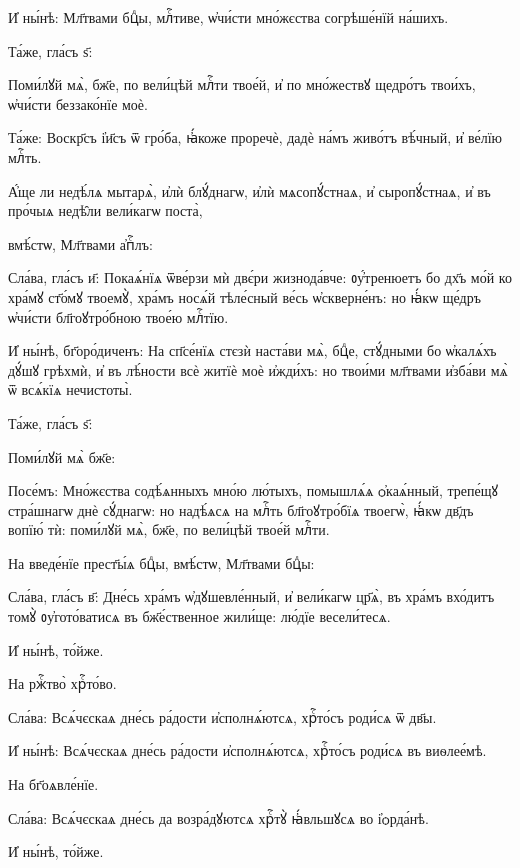 \hKv И҆ ны́нѣ: Мл҃твами бцⷣы, млⷭ҇тиве, ѡ҆чи́сти мно́жєства  согрѣше́нїй на́шихъ. 

\hKv Та́же, гла́съ ѕ҃: 

\hKv Поми́лꙋй мѧ̀, бж҃е, по вели́цѣй млⷭ҇ти твое́й, и҆ по  мно́жествꙋ щедро́тъ твои́хъ, ѡ҆чи́сти беззако́нїе моѐ.  

\hKv Та́же: Воскр҃съ і҆и҃съ ѿ гро́ба, ꙗ҆́коже проречѐ, дадѐ  на́мъ живо́тъ вѣ́чный, и҆ ве́лїю млⷭ҇ть. 

\hKv А҆́ще ли недѣ́лѧ мытарѧ̀, и҆лѝ блꙋ́днагѡ, и҆лѝ  мѧсопꙋ́стнаѧ, и҆ сыропꙋ́стнаѧ, и҆ въ про́чыѧ недѣ̑ли  вели́кагѡ поста̀, 

\hKv вмѣ́стѡ, Мл҃твами а҆пⷭ҇лъ: 

\hKv Сла́ва, гла́съ и҃: Покаѧ́нїѧ ѿве́рзи мѝ двє́ри  жизнода́вче: ᲂу҆́тренюетъ бо дх҃ъ мо́й ко хра́мꙋ ст҃о́мꙋ  твоемꙋ̀, хра́мъ носѧ́й тѣле́сный ве́сь ѡ҆скверне́нъ: но  ꙗ҆́кѡ ще́дръ ѡ҆чи́сти бл҃гоꙋтро́бною твое́ю млⷭ҇тїю. 

\hKv И҆ ны́нѣ, бг҃оро́диченъ: На сп҃се́нїѧ стєзѝ наста́ви мѧ̀,  бцⷣе, стꙋ́дными бо ѡ҆калѧ́хъ дꙋ́шꙋ грѣхмѝ, и҆ въ  лѣ́ности всѐ житїѐ моѐ и҆жди́хъ: но твои́ми мл҃твами  и҆зба́ви мѧ̀ ѿ всѧ́кїѧ нечистоты̀. 

\hKv Та́же, гла́съ ѕ҃:  

\hKv Поми́лꙋй мѧ̀ бж҃е: 
%

\hKv Посе́мъ: Мно́жєства содѣ́ѧнныхъ мно́ю лю́тыхъ, помышлѧ́ѧ  ѻ҆каѧ́нный, трепе́щꙋ стра́шнагѡ днѐ сꙋ́днагѡ: но надѣ́ѧсѧ  на млⷭ҇ть бл҃гоꙋтро́бїѧ твоегѡ̀, ꙗ҆́кѡ дв҃дъ вопїю́ тѝ:  поми́лꙋй мѧ̀, бж҃е, по вели́цѣй твое́й млⷭ҇ти. 

\hKv На введе́нїе прест҃ы́ѧ бцⷣы, вмѣ́стѡ, Мл҃твами бцⷣы: 

\hKv Сла́ва, гла́съ в҃: Дне́сь хра́мъ ѡ҆дꙋшевле́нный, и҆  вели́кагѡ цр҃ѧ̀, въ хра́мъ вхо́дитъ томꙋ̀ ᲂу҆гото́ватисѧ въ  бж҃е́ственное жили́ще: лю́дїе весели́тесѧ. 

\hKv И҆ ны́нѣ, то́йже. 

\hKv На ржⷭ҇тво̀ хрⷭ҇то́во. 

\hKv Сла́ва: Всѧ́чєскаѧ дне́сь ра́дости и҆сполнѧ́ютсѧ, хрⷭ҇то́съ  роди́сѧ ѿ дв҃ы. 

\hKv И҆ ны́нѣ: Всѧ́чєскаѧ дне́сь ра́дости и҆сполнѧ́ютсѧ,  хрⷭ҇то́съ роди́сѧ въ виѳлее́мѣ.  

\hKv На бг҃оѧвле́нїе. 

\hKv Сла́ва: Всѧ́чєскаѧ дне́сь да возра́дꙋютсѧ хрⷭ҇тꙋ̀  ꙗ҆́вльшꙋсѧ во і҆ѻрда́нѣ.  

\hKv И҆ ны́нѣ, то́йже. 

